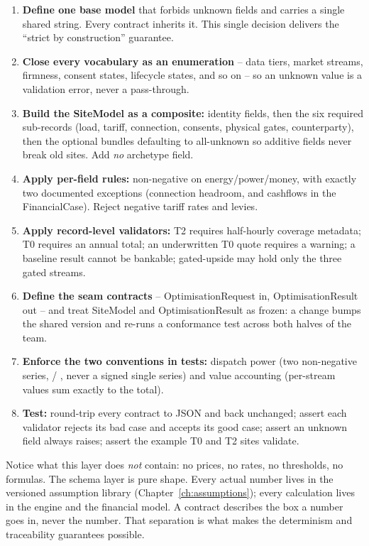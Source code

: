 \begin{rebuild}
\begin{enumerate}
  \item \textbf{Define one base model} that forbids unknown fields and carries a single shared  string. Every contract inherits it. This single decision delivers the ``strict by construction'' guarantee.
  \item \textbf{Close every vocabulary as an enumeration} -- data tiers, market streams, firmness, consent states, lifecycle states, and so on -- so an unknown value is a validation error, never a pass-through.
  \item \textbf{Build the SiteModel as a composite:} identity fields, then the six required sub-records (load, tariff, connection, consents, physical gates, counterparty), then the optional bundles defaulting to all-unknown so additive fields never break old sites. Add \emph{no} archetype field.
  \item \textbf{Apply per-field rules:} non-negative on energy/power/money, with exactly two documented exceptions (connection headroom, and cashflows in the FinancialCase). Reject negative tariff rates and levies.
  \item \textbf{Apply record-level validators:} T2 requires half-hourly coverage metadata; T0 requires an annual total; an underwritten T0 quote requires a warning; a baseline result cannot be bankable; gated-upside may hold only the three gated streams.
  \item \textbf{Define the seam contracts} -- OptimisationRequest in, OptimisationResult out -- and treat SiteModel and OptimisationResult as frozen: a change bumps the shared version and re-runs a conformance test across both halves of the team.
  \item \textbf{Enforce the two conventions in tests:} dispatch power (two non-negative series,  / , never a signed single series) and value accounting (per-stream values sum exactly to the total).
  \item \textbf{Test:} round-trip every contract to JSON and back unchanged; assert each validator rejects its bad case and accepts its good case; assert an unknown field always raises; assert the example T0 and T2 sites validate.
\end{enumerate}
\end{rebuild}

\begin{plainnote}
Notice what this layer does \emph{not} contain: no prices, no rates, no thresholds, no formulas. The schema layer is pure shape. Every actual number lives in the versioned assumption library (Chapter~\ref{ch:assumptions}); every calculation lives in the engine and the financial model. A contract describes the box a number goes in, never the number. That separation is what makes the determinism and traceability guarantees possible.
\end{plainnote}
